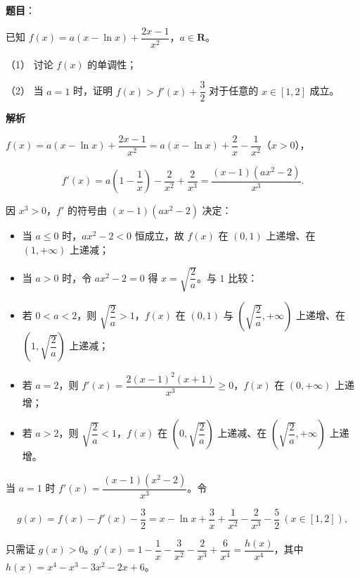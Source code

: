 \begin{answer}

\textbf{题目}：

已知 \(f(x)=a(x-\ln x)+\dfrac{2x-1}{x^{2}}\)，\(a\in\mathbf{R}\)。

（1） 讨论 \(f(x)\) 的单调性；

（2） 当 \(a=1\) 时，证明 \(f(x)>f'(x)+\dfrac{3}{2}\) 对于任意的 \(x\in[1,2]\) 成立。

\textbf{解析}


\(f(x)=a(x-\ln x)+\dfrac{2x-1}{x^{2}}=a(x-\ln x)+\dfrac{2}{x}-\dfrac{1}{x^{2}}\)（\(x>0\)），

\nopagebreak[4]
\[
f'(x)=a\left(1-\dfrac{1}{x}\right)-\dfrac{2}{x^{2}}+\dfrac{2}{x^{3}}=\dfrac{(x-1)(ax^{2}-2)}{x^{3}}.
\]

因 \(x^{3}>0\)，\(f'\) 的符号由 \((x-1)(ax^{2}-2)\) 决定：

\begin{itemize}
\item 当 \(a\leqslant 0\) 时，\(ax^{2}-2<0\) 恒成立，故 \(f(x)\) 在 \((0,1)\) 上递增、在 \((1,+\infty)\) 上递减；
\item 当 \(a>0\) 时，令 \(ax^{2}-2=0\) 得 \(x=\sqrt{\dfrac{2}{a}}\)。与 \(1\) 比较：
\item 若 \(0<a<2\)，则 \(\sqrt{\dfrac{2}{a}}>1\)，\(f(x)\) 在 \((0,1)\) 与 \(\left(\sqrt{\dfrac{2}{a}},+\infty\right)\) 上递增、在 \(\left(1,\sqrt{\dfrac{2}{a}}\right)\) 上递减；
\item 若 \(a=2\)，则 \(f'(x)=\dfrac{2(x-1)^{2}(x+1)}{x^{3}}\geqslant 0\)，\(f(x)\) 在 \((0,+\infty)\) 上递增；
\item 若 \(a>2\)，则 \(\sqrt{\dfrac{2}{a}}<1\)，\(f(x)\) 在 \(\left(0,\sqrt{\dfrac{2}{a}}\right)\) 上递减、在 \(\left(\sqrt{\dfrac{2}{a}},+\infty\right)\) 上递增。
\end{itemize}


当 \(a=1\) 时 \(f'(x)=\dfrac{(x-1)(x^{2}-2)}{x^{3}}\)。令

\nopagebreak[4]
\[
g(x)=f(x)-f'(x)-\dfrac{3}{2}=x-\ln x+\dfrac{3}{x}+\dfrac{1}{x^{2}}-\dfrac{2}{x^{3}}-\dfrac{5}{2}\ (x\in[1,2]),
\]

只需证 \(g(x)>0\)。\(g'(x)=1-\dfrac{1}{x}-\dfrac{3}{x^{2}}-\dfrac{2}{x^{3}}+\dfrac{6}{x^{4}}=\dfrac{h(x)}{x^{4}}\)，其中 \(h(x)=x^{4}-x^{3}-3x^{2}-2x+6\)。


\end{answer}
